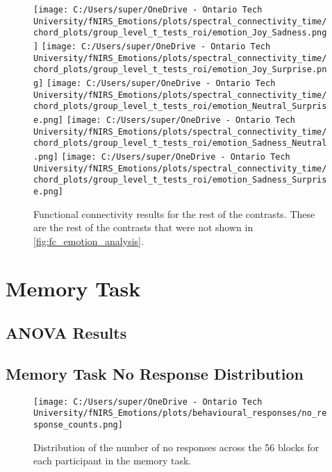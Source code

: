 \begin{figure}[H]
    \texttt{[image: C:/Users/super/OneDrive - Ontario Tech University/fNIRS\_Emotions/plots/spectral\_connectivity\_time/chord\_plots/group\_level\_t\_tests\_roi/emotion\_Joy\_Sadness.png]}
    \texttt{[image: C:/Users/super/OneDrive - Ontario Tech University/fNIRS\_Emotions/plots/spectral\_connectivity\_time/chord\_plots/group\_level\_t\_tests\_roi/emotion\_Joy\_Surprise.png]}
    \texttt{[image: C:/Users/super/OneDrive - Ontario Tech University/fNIRS\_Emotions/plots/spectral\_connectivity\_time/chord\_plots/group\_level\_t\_tests\_roi/emotion\_Neutral\_Surprise.png]}
    \texttt{[image: C:/Users/super/OneDrive - Ontario Tech University/fNIRS\_Emotions/plots/spectral\_connectivity\_time/chord\_plots/group\_level\_t\_tests\_roi/emotion\_Sadness\_Neutral.png]}
    \texttt{[image: C:/Users/super/OneDrive - Ontario Tech University/fNIRS\_Emotions/plots/spectral\_connectivity\_time/chord\_plots/group\_level\_t\_tests\_roi/emotion\_Sadness\_Surprise.png]}
    \caption[FC: Additional emotion contrasts]{Functional connectivity results for the rest of the contrasts.
    These are the rest of the contrasts that were not shown in \ref{fig:fc_emotion_analysis}. }
    \label{fig:appendix_fc_emotion_analysis}
\end{figure}

\label{tab:appendix_fc_emotion_analysis}


\chapter{Memory Task}
\section{ANOVA Results}
\label{tab:appendix_memory_task_anova}


\section{Memory Task No Response Distribution}
\begin{figure}[H]
    \centering
    \texttt{[image: C:/Users/super/OneDrive - Ontario Tech University/fNIRS\_Emotions/plots/behavioural\_responses/no\_response\_counts.png]}
    \caption[Memory Task No Response Distribution]{Distribution of the number of no responses across the 56 blocks for each participant in the memory task.}
    \label{fig:appendix_memory_task_no_response_distribution}
\end{figure}